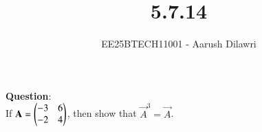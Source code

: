 \documentclass[journal]{IEEEtran}
\begin{document}

\vspace{3cm}

\title{5.7.14}
\author{EE25BTECH11001 - Aarush Dilawri}
\maketitle
{\let\newpage\relax\maketitle}

\renewcommand{\thefigure}{\theenumi}
\renewcommand{\thetable}{\theenumi}
\setlength{\intextsep}{10pt} %


\renewcommand{\thetable}{\theenumi}

\textbf{Question}:\\
If $\mathbf{A} = \begin{pmatrix}-3 & 6 \\ -2 & 4\end{pmatrix}$, then show that $\vec{A}^3 = \vec{A}$.

\solution \\
\end{document}
